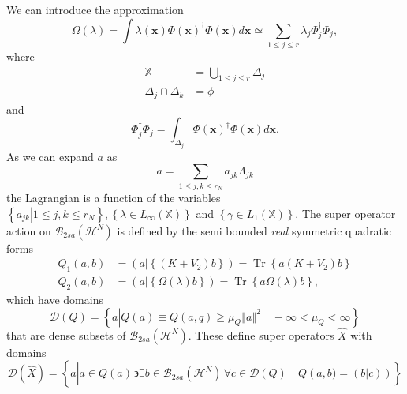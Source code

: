\documentclass[aps,preprint]{revtex4}%
\begin{document}
We can introduce the approximation
\begin{equation}
\Omega\left(  \lambda\right)  =\int\lambda\left(  \mathbf{x}\right)
\Phi\left(  \mathbf{x}\right)  ^{\dagger}\Phi\left(  \mathbf{x}\right)
d\mathbf{x\simeq}\sum_{1\leq j\leq r}\lambda_{j}\Phi_{j}^{\dagger}\Phi_{j},
\end{equation}
where
\begin{align}
\mathbb{X}  & \mathbb{=}\bigcup\limits_{1\leq j\leq r}\mathbb{\Delta}_{j}\\
\mathbb{\Delta}_{j}\cap\mathbb{\Delta}_{k}  & =\phi
\end{align}
and
\begin{equation}
\Phi_{j}^{\dagger}\Phi_{j}=\int_{\mathbb{\Delta}_{j}}\Phi\left(
\mathbf{x}\right)  ^{\dagger}\Phi\left(  \mathbf{x}\right)  d\mathbf{x.}%
\end{equation}
As we can expand $a$ as
\begin{equation}
a=\sum_{1\leq j,k\leq r_{N}}a_{jk}\Lambda_{jk}%
\end{equation}
the Lagrangian is a function of the variables $\left\{  \left.  a_{jk}%
\right\vert 1\leq j,k\leq r_{N}\right\}  ,\left\{  \lambda\in L_{\infty
}\left(  \mathbb{X}\right)  \right\}  $ and $\left\{  \gamma\in L_{1}\left(
\mathbb{X}\right)  \right\}  .$ The super operator action on $\mathcal{B}%
_{2sa}\left(  \mathcal{H}^{N}\right)  $ is defined by the semi bounded
\emph{real }symmetric quadratic forms
\begin{align}
Q_{1}\left(  a,b\right)   &  =\left(  a\left\vert \left\{  \left(
K+V_{2}\right)  b\right\}  \right.  \right)  =\operatorname{Tr}\left\{
a\left(  K+V_{2}\right)  b\right\}  \nonumber\\
Q_{2}\left(  a,b\right)   &  =\left(  a\left\vert \left\{  \Omega\left(
\lambda\right)  b\right\}  \right.  \right)  =\operatorname{Tr}\left\{
a\Omega\left(  \lambda\right)  b\right\}  ,
\end{align}
which have domains
\begin{equation}
\mathcal{D}\left(  Q\right)  =\left\{  a\left\vert Q\left(  a\right)  \equiv
Q\left(  a,q\right)  \geq\mu_{Q}\left\Vert a\right\Vert ^{2}\right.
\quad-\infty<\mu_{Q}<\infty\right\}
\end{equation}
that are dense subsets of $\mathcal{B}_{2sa}\left(  \mathcal{H}^{N}\right)  .$
These define super operators $\widehat{X}$ with domains
\begin{equation}
\mathcal{D}\left(  \widehat{X}\right)  =\left\{  a\left\vert \overset{}{a\in
Q\left(  a\right)  \,\backepsilon\exists b\in\mathcal{B}_{2sa}\left(
\mathcal{H}^{N}\right)  \,\forall c\in\mathcal{D}\left(  Q\right)  \quad
Q\left(  a,b)=\left(  \left.  b\right\vert c\right)  \right)  }\right.
\right\}
\end{equation}
\end{document}

